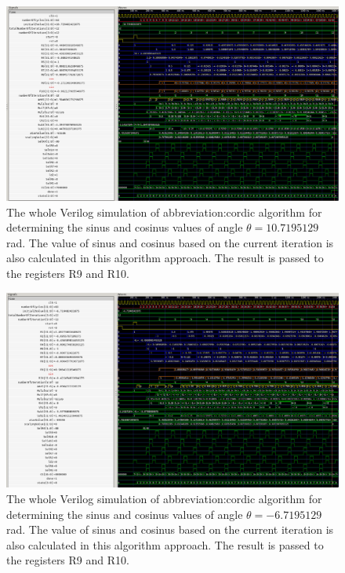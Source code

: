 \documentclass[a4paper, twoside, 11pt]{article}
\begin{document}
        \begin{figure}[htbp!]
            \centering
            \includegraphics[width=1\textwidth]{src/png/cordic-verilog-whole-sim-10_719.png}
            \caption{The whole Verilog simulation of \gls{abbreviation:cordic} algorithm for determining the sinus and cosinus values of angle $\theta = 10.7195129$ rad. The value of sinus and cosinus based on the current iteration is also calculated in this algorithm approach. The result is passed to the registers R9 and R10.}
            \label{fig:cordic-verilog-whole-sim-10_719}
        \end{figure}

        \begin{figure}[htbp!]
            \centering
            \includegraphics[width=1\textwidth]{src/png/cordic-verilog-whole-sim_minus_6_7195129.png}
            \caption{The whole Verilog simulation of \gls{abbreviation:cordic} algorithm for determining the sinus and cosinus values of angle $\theta = - 6.7195129$ rad. The value of sinus and cosinus based on the current iteration is also calculated in this algorithm approach. The result is passed to the registers R9 and R10.}
            \label{fig:cordic-verilog-whole-sim_minus_6_7195129}
        \end{figure}
\end{document}
